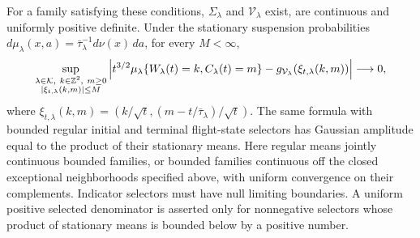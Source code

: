\begin{theorem}
\label{thm:v35-action-family-LLT}
For a family satisfying these conditions, $\Sigma_\lambda$ and
$\mathcal V_\lambda$ exist, are continuous and uniformly positive
definite. Under the stationary suspension probabilities
$d\mu_\lambda(x,a)=\bar\tau_\lambda^{-1}d\nu(x)\,da$, for every
$M<\infty$,
\begin{equation}\label{eq:v35-family-singleton}
 \sup_{\substack{\lambda\in\mathcal K,\ k\in\mathbb Z^2,\ m\ge0\\
                 |\xi_{t,\lambda}(k,m)|\le M}}
 \left|t^{3/2}\mu_\lambda\{W_\lambda(t)=k,C_\lambda(t)=m\}
                 -g_{\mathcal V_\lambda}(\xi_{t,\lambda}(k,m))\right|
                       \longrightarrow0,
\end{equation}
where $\xi_{t,\lambda}(k,m)=(k/\sqrt t,
(m-t/\bar\tau_\lambda)/\sqrt t)$.
The same formula with bounded regular initial and terminal flight-state
selectors has Gaussian amplitude equal to the product of their
stationary means. Here regular means jointly continuous bounded
families, or bounded families continuous off the closed exceptional
neighborhoods specified above, with uniform convergence on their
complements. Indicator selectors must have null limiting boundaries.
A uniform positive selected denominator is asserted only for
nonnegative selectors whose product of stationary means is bounded
below by a positive number.
\end{theorem}
